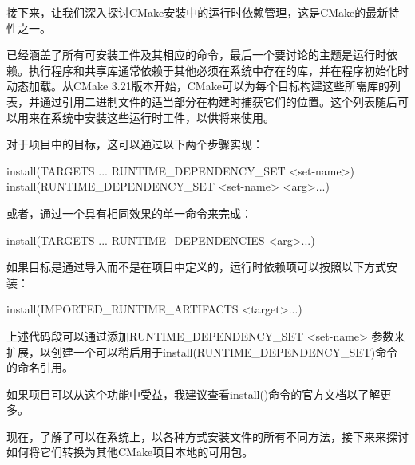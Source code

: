 接下来，让我们深入探讨CMake安装中的运行时依赖管理，这是CMake的最新特性之一。


已经涵盖了所有可安装工件及其相应的命令，最后一个要讨论的主题是运行时依赖。执行程序和共享库通常依赖于其他必须在系统中存在的库，并在程序初始化时动态加载。从CMake 3.21版本开始，CMake可以为每个目标构建这些所需库的列表，并通过引用二进制文件的适当部分在构建时捕获它们的位置。这个列表随后可以用来在系统中安装这些运行时工件，以供将来使用。

对于项目中的目标，这可以通过以下两个步骤实现：

\begin{shell}
install(TARGETS ... RUNTIME_DEPENDENCY_SET <set-name>)
install(RUNTIME_DEPENDENCY_SET <set-name> <arg>...)
\end{shell}

或者，通过一个具有相同效果的单一命令来完成：

\begin{shell}
install(TARGETS ... RUNTIME_DEPENDENCIES <arg>...)
\end{shell}

如果目标是通过导入而不是在项目中定义的，运行时依赖项可以按照以下方式安装：

\begin{shell}
install(IMPORTED_RUNTIME_ARTIFACTS <target>...)
\end{shell}

上述代码段可以通过添加RUNTIME\_DEPENDENCY\_SET <set-name> 参数来扩展，以创建一个可以稍后用于install(RUNTIME\_DEPENDENCY\_SET)命令的命名引用。

如果项目可以从这个功能中受益，我建议查看install()命令的官方文档以了解更多。

现在，了解了可以在系统上，以各种方式安装文件的所有不同方法，接下来来探讨如何将它们转换为其他CMake项目本地的可用包。










